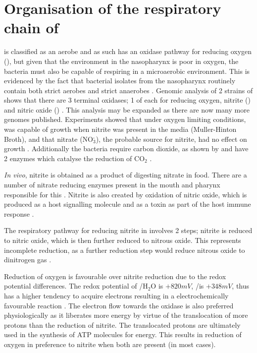 \section{Organisation of the respiratory chain of \Nm}

\Nm\space is classified as an aerobe and as such has an oxidase pathway for reducing oxygen (\cOxygen), but given that the environment in the nasopharynx is poor in oxygen, the bacteria must also be capable of respiring in a microaerobic environment. This is evidenced by the fact that bacterial isolates from the nasopharynx routinely contain both strict aerobes and strict anaerobes \cite{Rock2005}. Genomic analysis of 2 strains of \Nm\space shows that there are 3 terminal oxidases; 1 of each for reducing oxygen, nitrite (\cNitrite) and nitric oxide (\cNO) \cite{Rock2005a}. This analysis may be expanded as there are now many more genomes published. Experiments showed that under oxygen limiting conditions, \Nm\space was capable of growth when nitrite was present in the media (Muller-Hinton Broth), and that nitrate (NO$_{\textrm{3}}^{\textrm{-}}$), the probable source for nitrite, had no effect on growth \cite{Rock2005a}. Additionally the bacteria require carbon dioxide, as shown by \citet{Tuttle1952} and have 2 enzymes which catalyse the reduction of CO$_{\textrm{2}}$ \cite{IWDeVoe06011982}.

\textit{In vivo}, nitrite is obtained as a product of digesting nitrate in food. There are a number of nitrate reducing enzymes present in the mouth and pharynx responsible for this \cite{Rock2005}. Nitrite is also created by oxidation of nitric oxide, which is produced as a host signalling molecule and as a toxin as part of the host immune response \cite{Lundberg2004,Rock2005}.

The respiratory pathway for reducing nitrite in \Nm\space involves 2 steps; nitrite is reduced to nitric oxide, which is then further reduced to nitrous oxide. This represents incomplete reduction, as a further reduction step would reduce nitrous oxide to dinitrogen gas \cite{Rock2005,Deeudom2006}.

Reduction of oxygen is favourable over nitrite reduction due to the redox potential differences. The redox potential of \cOxygen/H$_{\textrm{2}}$O is $+820mV$, \cNitrite/\cNO\space is $+348mV$, thus \cOxygen\space has a higher tendency to acquire electrons resulting in a electrochemically favourable reaction \cite{Deeudom2007}. The electron flow towards the oxidase is also preferred physiologically as it liberates more energy by virtue of the translocation of more protons than the reduction of nitrite. The translocated protons are ultimately used in the synthesis of ATP molecules for energy. This results in reduction of oxygen in preference to nitrite when both are present (in most cases).

